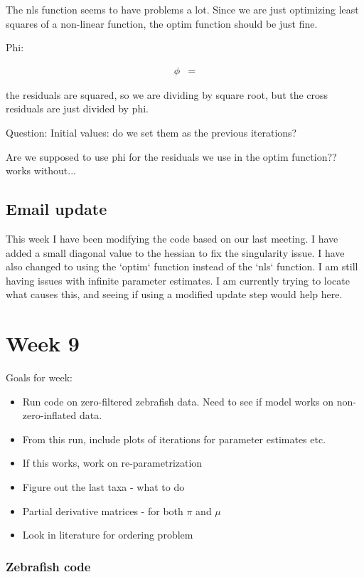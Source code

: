 \documentclass[10pt]{article}
\begin{document}
The nls function seems to have problems a lot. Since we are just optimizing least squares of a non-linear function, the optim function should be just fine.

Phi:

\begin{align*}
  \phi &=
\end{align*}

the residuals are squared, so we are dividing by square root, but the cross residuals are just divided by phi.

Question:
Initial values: do we set them as the previous iterations?


Are we supposed to use phi for the residuals we use in the optim function?? works without...



\subsection{Email update}
This week I have been modifying the code based on our last meeting. I have added a small diagonal value to the hessian to fix the singularity issue. I have also changed to using the `optim` function instead of the `nls` function. I am still having issues with infinite parameter estimates. I am currently trying to locate what causes this, and seeing if using a modified update step would help here. 


\section{Week 9}

Goals for week:
\begin{itemize}
  \item Run code on zero-filtered zebrafish data. Need to see if model works on non-zero-inflated data.
  \item From this run, include plots of iterations for parameter estimates etc.
  \item If this works, work on re-parametrization
  \item Figure out the last taxa - what to do
  \item Partial derivative matrices - for both $\pi$ and $\mu$
  \item Look in literature for ordering problem
\end{itemize}

\subsubsection*{Zebrafish code}
\end{document}
